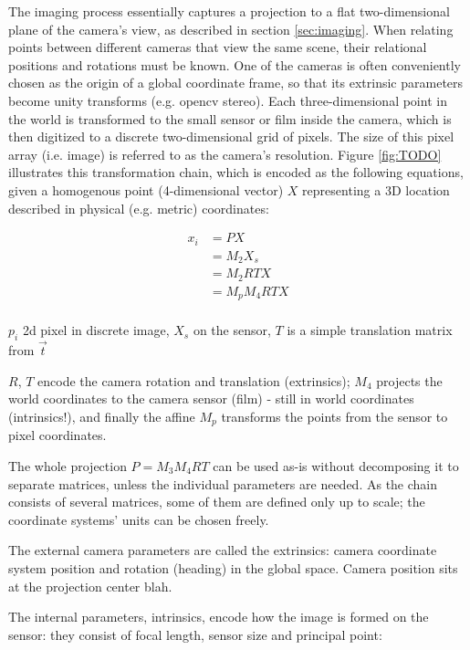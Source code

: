 The imaging process essentially captures a projection to a flat two-dimensional plane of the camera's view, as described in section \ref{sec:imaging}.
When relating points between different cameras that view the same scene, their relational positions and rotations must be known.
One of the cameras is often conveniently chosen as the origin of a global coordinate frame, so that its extrinsic parameters become unity transforms (e.g. opencv stereo).
Each three-dimensional point in the world is transformed to the small sensor or film inside the camera, which is then digitized to a discrete two-dimensional grid of pixels. The size of this pixel array (i.e. image) is referred to as the camera's resolution.
Figure \ref{fig:TODO} illustrates this transformation chain, which is encoded as the following equations, given a homogenous point (4-dimensional vector) $X$ representing a 3D location described in physical (e.g. metric) coordinates:

\begin{align}
	x_i &= P X\\
	  &= M_2 X_s\\ %
	  &= M_2 R T X\\
	  &= M_p M_4 R T X\\ %
\end{align}

$p_i$ 2d pixel in discrete image, $X_s$ on the sensor, $T$ is a simple translation matrix from $\vec t$

$R$, $T$ encode the camera rotation and translation (extrinsics); $M_4$ projects the world coordinates to the camera sensor (film) - still in world coordinates (intrinsics!), and finally the affine $M_p$ transforms the points from the sensor to pixel coordinates.

The whole projection $P = M_3 M_4 R T$ can be used as-is without decomposing it to separate matrices, unless the individual parameters are needed. As the chain consists of several matrices, some of them are defined only up to scale; the coordinate systems' units can be chosen freely.

The external camera parameters are called the extrinsics: camera coordinate system position and rotation (heading) in the global space.
Camera position sits at the projection center blah.

The internal parameters, intrinsics, encode how the image is formed on the sensor: they consist of focal length, sensor size and principal point:

